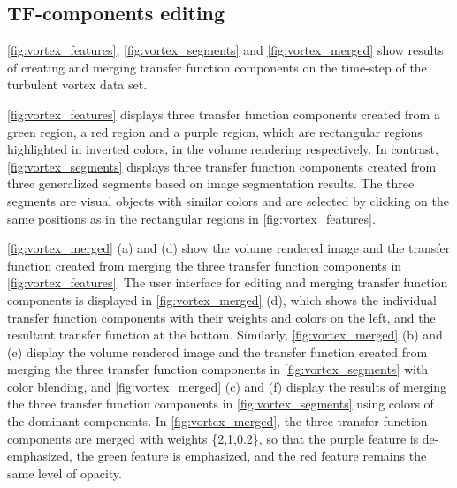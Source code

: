 \documentclass[twoside,twocolumn,10pt]{article}
\begin{document}

\subsection{TF-components editing}
\autoref{fig:vortex_features}, \autoref{fig:vortex_segments} and \autoref{fig:vortex_merged} show results of creating and merging transfer function components on the time-step of the turbulent vortex data set.

\autoref{fig:vortex_features} displays three transfer function components created from a green region, a red region and a purple region, which are rectangular regions highlighted in inverted colors, in the volume rendering respectively.
In contrast, \autoref{fig:vortex_segments} displays three transfer function components created from three generalized segments based on image segmentation results. The three segments are visual objects with similar colors and are selected by clicking on the same positions as in the rectangular regions in \autoref{fig:vortex_features}.

\autoref{fig:vortex_merged} (a) and (d) show the volume rendered image and the transfer function created from merging the three transfer function components in \autoref{fig:vortex_features}.
The user interface for editing and merging transfer function components is displayed in \autoref{fig:vortex_merged} (d), which shows the individual transfer function components with their weights and colors on the left, and the resultant transfer function at the bottom.
Similarly, \autoref{fig:vortex_merged} (b) and (e) display the volume rendered image and the transfer function created from merging the three transfer function components in \autoref{fig:vortex_segments} with color blending, and \autoref{fig:vortex_merged} (c) and (f) display the results of merging the three transfer function components in \autoref{fig:vortex_segments} using colors of the dominant components.
In \autoref{fig:vortex_merged}, the three transfer function components are merged with weights \{2,1,0.2\}, so that the purple feature is de-emphasized, the green feature is emphasized, and the red feature remains the same level of opacity.
\end{document}
